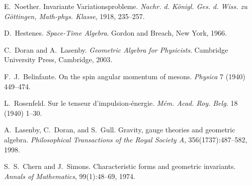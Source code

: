 \documentclass[11pt,a4paper]{article}
\numberwithin{equation}{section}
\theoremstyle{plain}
\theoremstyle{definition}
\theoremstyle{remark}
\begin{document}
\begin{thebibliography}{9}

E.~Noether.
\newblock Invariante Variationsprobleme.
\newblock \emph{Nachr. d. Königl. Ges. d. Wiss. zu Göttingen, Math-phys. Klasse}, 1918, 235--257.

D.~Hestenes.
\newblock \emph{Space-Time Algebra}.
\newblock Gordon and Breach, New York, 1966.

C.~Doran and A.~Lasenby.
\newblock \emph{Geometric Algebra for Physicists}.
\newblock Cambridge University Press, Cambridge, 2003.

F.~J.~Belinfante.
\newblock On the spin angular momentum of mesons.
\newblock \emph{Physica} 7 (1940) 449--474.

L.~Rosenfeld.
\newblock Sur le tenseur d'impulsion-énergie.
\newblock \emph{Mém. Acad. Roy. Belg.} 18 (1940) 1--30.

A.~Lasenby, C.~Doran, and S.~Gull.
\newblock Gravity, gauge theories and geometric algebra.
\newblock \emph{Philosophical Transactions of the Royal Society A}, 356(1737):487--582, 1998.

S.~S.~Chern and J.~Simons.
\newblock Characteristic forms and geometric invariants.
\newblock \emph{Annals of Mathematics}, 99(1):48--69, 1974.

\end{thebibliography}
\end{document}
